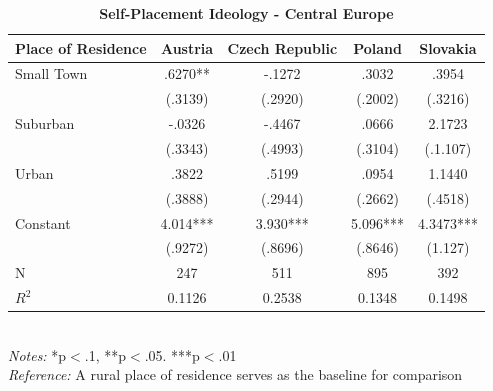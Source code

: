 \documentclass[12pt, titlepage]{article}
\newcommand\e{\emph}
\newcommand\tb{\textbf}
\begin{document}
\begin{singlespace}
	\begin{table}[H]
		\centering
		\caption{\tb{Self-Placement Ideology - Central Europe}}
		\begin{tabulary}{\linewidth}{l c c c c}
			\\
			\hline
			\tb{Place of Residence} &\tb{Austria}&\tb{Czech Republic}& \tb{Poland} &\tb{Slovakia} \\
			\hline
			Small Town&.6270**& -.1272 & .3032 & .3954  \\
			&(.3139) & (.2920) & (.2002) & (.3216) \\
			Suburban&-.0326& -.4467&.0666 & 2.1723\\
			&(.3343)&(.4993) & (.3104) & (.1.107)\\
			Urban&.3822&.5199 & .0954 & 1.1440 \\
			&(.3888) &(.2944) & (.2662) & (.4518) \\
			Constant& 4.014***& 3.930***& 5.096*** & 4.3473***  \\
			&(.9272) & (.8696) & (.8646) & (1.127) \\
			N&247& 511& 895 & 392 \\
			$R^2$&0.1126&0.2538 & 0.1348 & 0.1498 \\
			\hline
		\end{tabulary}
		\\
		\e{Notes:} *p$<$.1, **p$<$.05. ***p$<$.01 \\
		\e{Reference:} A rural place of residence serves as the baseline for comparison
		\label{table7}
	\end{table}
\end{singlespace}
\end{document}
